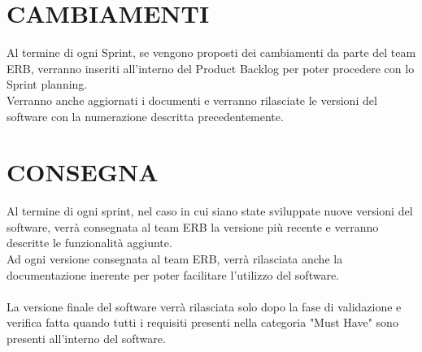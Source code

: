 \documentclass{report}
\begin{document}
\chapter{CAMBIAMENTI}
Al termine di ogni Sprint, se vengono proposti dei cambiamenti da parte del team ERB, verranno inseriti all'interno del Product Backlog per poter procedere con lo Sprint planning.\\
Verranno anche aggiornati i documenti e verranno rilasciate le versioni del software con la numerazione descritta precedentemente.

\begingroup
\let\clearpage\relax
\chapter{CONSEGNA}
\endgroup

Al termine di ogni sprint, nel caso in cui siano state sviluppate nuove versioni del software, verrà consegnata al team ERB la versione più recente e verranno descritte le funzionalità aggiunte.\\
Ad ogni versione consegnata al team ERB, verrà rilasciata anche la documentazione inerente per poter facilitare l'utilizzo del software.\\\\
La versione finale del software verrà rilasciata solo dopo la fase di validazione e verifica fatta quando tutti i requisiti presenti nella categoria "Must Have" sono presenti all'interno del software.
\end{document}
